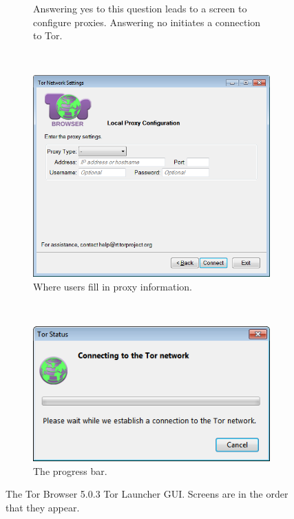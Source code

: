 \documentclass[USenglish,oneside,twocolumn]{article}
\begin{document}
\begin{figure}
\begin{subfigure}[b]{0.30\textwidth}
	\centering\captionsetup{width=1.5\linewidth}%
	\caption{Answering yes to this question leads to a screen to configure proxies. Answering no initiates a connection to Tor.}
	\label{fig:old-proxy}
\end{subfigure}
~~~~~~~~~~
\begin{subfigure}[b]{0.30\textwidth}
	\includegraphics[width=\textwidth]{screenshots/OLD-proxyYES.png}
	\centering\captionsetup{width=1.5\linewidth}%
	\caption{Where users fill in proxy information.}
	\label{fig:old-proxy-yes}
\end{subfigure}
~~~~~~~~~~~~~~~~~~~~~~~~~
\begin{subfigure}[b]{0.30\textwidth}
	\includegraphics[width=\textwidth]{screenshots/OLD-progress.png}
	\centering\captionsetup{width=1.5\linewidth}%
	\caption{The progress bar.}
	\label{fig:old-progress}
\end{subfigure}
\caption{
The Tor Browser 5.0.3 Tor Launcher GUI. Screens are in the order that they appear. 
}
\label{fig:old-interface}
\end{figure} 
\end{document}
